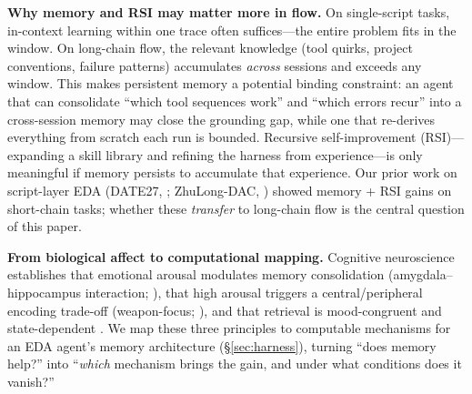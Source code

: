 \textbf{Why memory and RSI may matter more in flow.} On single-script tasks, in-context learning within one trace often suffices---the entire problem fits in the window. On long-chain flow, the relevant knowledge (tool quirks, project conventions, failure patterns) accumulates \emph{across} sessions and exceeds any window. This makes persistent memory a potential binding constraint: an agent that can consolidate ``which tool sequences work'' and ``which errors recur'' into a cross-session memory may close the grounding gap, while one that re-derives everything from scratch each run is bounded. Recursive self-improvement (RSI)---expanding a skill library and refining the harness from experience---is only meaningful if memory persists to accumulate that experience. Our prior work on script-layer EDA (DATE27, \cite{PLACEHOLDER_DATE27_ZHULONG}; ZhuLong-DAC, \cite{liu2026runreadbackrefine}) showed memory + RSI gains on short-chain tasks; whether these \emph{transfer} to long-chain flow is the central question of this paper.

\textbf{From biological affect to computational mapping.} Cognitive neuroscience establishes that emotional arousal modulates memory consolidation (amygdala--hippocampus interaction; \cite{mcgaugh2004}), that high arousal triggers a central/peripheral encoding trade-off (weapon-focus; \cite{loftus1987}), and that retrieval is mood-congruent and state-dependent \cite{bower1981}. We map these three principles to computable mechanisms for an EDA agent's memory architecture (\S\ref{sec:harness}), turning ``does memory help?'' into ``\emph{which} mechanism brings the gain, and under what conditions does it vanish?''
